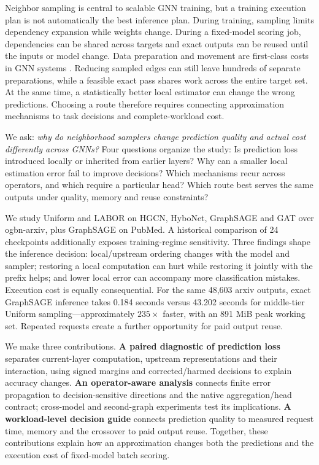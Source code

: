\documentclass[sigconf, nonacm]{acmart}
\begin{document}
Neighbor sampling is central to scalable GNN training, but a training execution plan is not automatically the best inference plan. During training, sampling limits dependency expansion while weights change. During a fixed-model scoring job, dependencies can be shared across targets and exact outputs can be reused until the inputs or model change. Data preparation and movement are first-class costs in GNN systems \cite{yuan2024comprehensive,kaler2022salient}. Reducing sampled edges can still leave hundreds of separate preparations, while a feasible exact pass shares work across the entire target set. At the same time, a statistically better local estimator can change the wrong predictions. Choosing a route therefore requires connecting approximation mechanisms to task decisions and complete-workload cost.

We ask: \emph{why do neighborhood samplers change prediction quality and actual cost differently across GNNs?} Four questions organize the study: Is prediction loss introduced locally or inherited from earlier layers? Why can a smaller local estimation error fail to improve decisions? Which mechanisms recur across operators, and which require a particular head? Which route best serves the same outputs under quality, memory and reuse constraints?

We study Uniform and LABOR on HGCN, HyboNet, GraphSAGE and GAT over ogbn-arxiv, plus GraphSAGE on PubMed. A historical comparison of 24 checkpoints additionally exposes training-regime sensitivity. Three findings shape the inference decision: local/upstream ordering changes with the model and sampler; restoring a local computation can hurt while restoring it jointly with the prefix helps; and lower local error can accompany more classification mistakes. Execution cost is equally consequential. For the same 48,603 arxiv outputs, exact GraphSAGE inference takes 0.184 seconds versus 43.202 seconds for middle-tier Uniform sampling---approximately $235\times$ faster, with an 891 MiB peak working set. Repeated requests create a further opportunity for paid output reuse.

We make three contributions. \textbf{A paired diagnostic of prediction loss} separates current-layer computation, upstream representations and their interaction, using signed margins and corrected/harmed decisions to explain accuracy changes. \textbf{An operator-aware analysis} connects finite error propagation to decision-sensitive directions and the native aggregation/head contract; cross-model and second-graph experiments test its implications. \textbf{A workload-level decision guide} connects prediction quality to measured request time, memory and the crossover to paid output reuse. Together, these contributions explain how an approximation changes both the predictions and the execution cost of fixed-model batch scoring.
\end{document}
